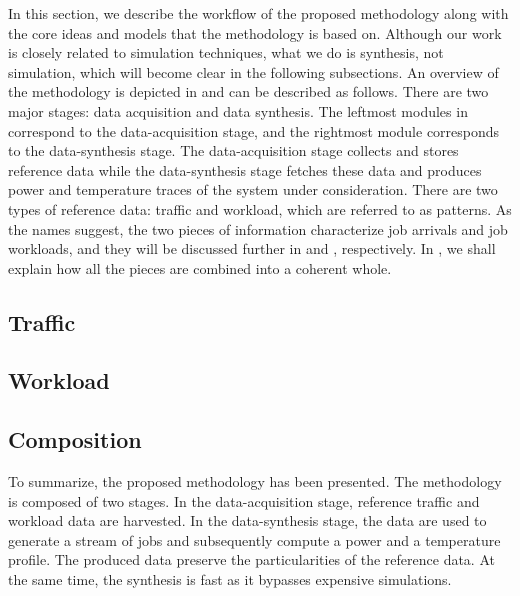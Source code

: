 In this section, we describe the workflow of the proposed methodology along with
the core ideas and models that the methodology is based on. Although our work is
closely related to simulation techniques, what we do is synthesis, not
simulation, which will become clear in the following subsections. An overview of
the methodology is depicted in  and can be described as
follows. There are two major stages: data acquisition and data synthesis. The
leftmost modules in  correspond to the data-acquisition stage,
and the rightmost module corresponds to the data-synthesis stage. The
data-acquisition stage collects and stores reference data while the
data-synthesis stage fetches these data and produces power and temperature
traces of the system under consideration. There are two types of reference data:
traffic and workload, which are referred to as patterns. As the names suggest,
the two pieces of information characterize job arrivals and job workloads, and
they will be discussed further in  and ,
respectively. In , we shall explain how all the pieces are
combined into a coherent whole.

\raggedbottom
\subsection{Traffic} 

\makeatletter
\afterpage{\global\let\@textbottom\relax \global\let\@texttop\relax}

\subsection{Workload} 


\subsection{Composition} 


To summarize, the proposed methodology has been presented. The methodology is
composed of two stages. In the data-acquisition stage, reference traffic and
workload data are harvested. In the data-synthesis stage, the data are used to
generate a stream of jobs and subsequently compute a power and a temperature
profile. The produced data preserve the particularities of the reference data.
At the same time, the synthesis is fast as it bypasses expensive simulations.
